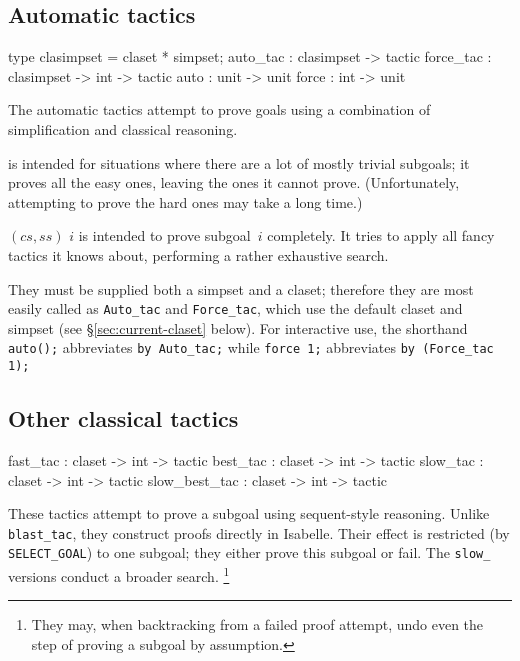 \subsection{Automatic tactics}\label{sec:automatic-tactics}
\begin{ttbox} 
type clasimpset = claset * simpset;
auto_tac        : clasimpset ->        tactic
force_tac       : clasimpset -> int -> tactic
auto            : unit -> unit
force           : int  -> unit
\end{ttbox}
The automatic tactics attempt to prove goals using a combination of
simplification and classical reasoning. 
\begin{ttdescription}
\item[\ttindexbold{auto_tac $(cs,ss)$}] is intended for situations where 
there are a lot of mostly trivial subgoals; it proves all the easy ones, 
leaving the ones it cannot prove.
(Unfortunately, attempting to prove the hard ones may take a long time.)  
\item[\ttindexbold{force_tac} $(cs,ss)$ $i$] is intended to prove subgoal~$i$ 
completely. It tries to apply all fancy tactics it knows about, 
performing a rather exhaustive search.
\end{ttdescription}
They must be supplied both a simpset and a claset; therefore 
they are most easily called as \texttt{Auto_tac} and \texttt{Force_tac}, which 
use the default claset and simpset (see \S\ref{sec:current-claset} below). 
For interactive use, 
the shorthand \texttt{auto();} abbreviates \texttt{by Auto_tac;} 
while \texttt{force 1;} abbreviates \texttt{by (Force_tac 1);}

\subsection{Other classical tactics}
\begin{ttbox} 
fast_tac      : claset -> int -> tactic
best_tac      : claset -> int -> tactic
slow_tac      : claset -> int -> tactic
slow_best_tac : claset -> int -> tactic
\end{ttbox}
These tactics attempt to prove a subgoal using sequent-style reasoning.
Unlike \texttt{blast_tac}, they construct proofs directly in Isabelle.  Their
effect is restricted (by \texttt{SELECT_GOAL}) to one subgoal; they either prove
this subgoal or fail.  The \texttt{slow_} versions conduct a broader
search.%
\footnote{They may, when backtracking from a failed proof attempt, undo even
  the step of proving a subgoal by assumption.}


